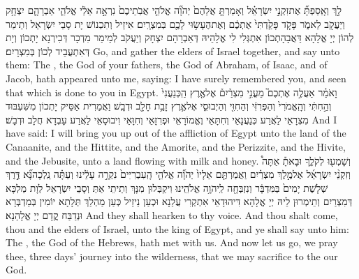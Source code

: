 {לֵ֣ךְ וְאָֽסַפְתָּ֞ אֶת\maqqaf זִקְנֵ֣י יִשְׂרָאֵ֗ל וְאָמַרְתָּ֤ אֲלֵהֶם֙ יְהֹוָ֞ה אֱלֹהֵ֤י אֲבֹֽתֵיכֶם֙ נִרְאָ֣ה אֵלַ֔י אֱלֹהֵ֧י אַבְרָהָ֛ם יִצְחָ֥ק וְיַעֲקֹ֖ב לֵאמֹ֑ר פָּקֹ֤ד פָּקַ֙דְתִּי֙ אֶתְכֶ֔ם וְאֶת\maqqaf הֶעָשׂ֥וּי לָכֶ֖ם בְּמִצְרָֽיִם׃}
{אִיזֵיל וְתִכְנוֹשׁ יָת סָבֵי יִשְׂרָאֵל וְתֵימַר לְהוֹן יְיָ אֱלָהָא דַּאֲבָהָתְכוֹן אִתְגְּלִי לִי אֱלָהֵיהּ דְּאַבְרָהָם יִצְחָק וְיַעֲקֹב לְמֵימַר מִדְכָר דְּכִירְנָא יָתְכוֹן וְיָת דְּאִתְעֲבֵיד לְכוֹן בְּמִצְרָיִם׃}
{Go, and gather the elders of Israel together, and say unto them: The \lord, the God of your fathers, the God of Abraham, of Isaac, and of Jacob, hath appeared unto me, saying: I have surely remembered you, and seen that which is done to you in Egypt.}{}
{וָאֹמַ֗ר אַעֲלֶ֣ה אֶתְכֶם֮ מֵעֳנִ֣י מִצְרַ֒יִם֒ אֶל\maqqaf אֶ֤רֶץ הַֽכְּנַעֲנִי֙ וְהַ֣חִתִּ֔י וְהָֽאֱמֹרִי֙ וְהַפְּרִזִּ֔י וְהַחִוִּ֖י וְהַיְבוּסִ֑י אֶל\maqqaf אֶ֛רֶץ זָבַ֥ת חָלָ֖ב וּדְבָֽשׁ׃}
{וַאֲמַרִית אַסֵּיק יָתְכוֹן מִשִּׁעְבּוּד מִצְרָאֵי לַאֲרַע כְּנַעֲנָאֵי וְחִתָּאֵי וֶאֱמוֹרָאֵי וּפְרִזָּאֵי וְחִוָּאֵי וִיבוּסָאֵי לַאֲרַע עָבְדָא חֲלָב וּדְבָשׁ׃}
{And I have said: I will bring you up out of the affliction of Egypt unto the land of the Canaanite, and the Hittite, and the Amorite, and the Perizzite, and the Hivite, and the Jebusite, unto a land flowing with milk and honey.}{}
{וְשָׁמְע֖וּ לְקֹלֶ֑ךָ וּבָאתָ֡ אַתָּה֩ וְזִקְנֵ֨י יִשְׂרָאֵ֜ל אֶל\maqqaf מֶ֣לֶךְ מִצְרַ֗יִם וַאֲמַרְתֶּ֤ם אֵלָיו֙ יְהֹוָ֞ה אֱלֹהֵ֤י הָֽעִבְרִיִּים֙ נִקְרָ֣ה עָלֵ֔ינוּ וְעַתָּ֗ה נֵֽלְכָה\maqqaf נָּ֞א דֶּ֣רֶךְ שְׁלֹ֤שֶׁת יָמִים֙ בַּמִּדְבָּ֔ר וְנִזְבְּחָ֖ה לַֽיהֹוָ֥ה אֱלֹהֵֽינוּ׃}
{וִיקַבְּלוּן מִנָּךְ וְתֵיתֵי אַתְּ וְסָבֵי יִשְׂרָאֵל לְוָת מַלְכָּא דְּמִצְרַיִם וְתֵימְרוּן לֵיהּ יְיָ אֱלָהָא דִּיהוּדָאֵי אִתְקְרִי עֲלַנָא וּכְעַן נֵיזֵיל כְּעַן מַהְלַךְ תְּלָתָא יוֹמִין בְּמַדְבְּרָא וּנְדַבַּח קֳדָם יְיָ אֱלָהַנָא׃}
{And they shall hearken to thy voice. And thou shalt come, thou and the elders of Israel, unto the king of Egypt, and ye shall say unto him: The \lord, the God of the Hebrews, hath met with us. And now let us go, we pray thee, three days’ journey into the wilderness, that we may sacrifice to the \lord\space our God.}{}
